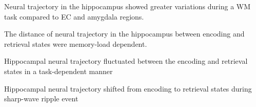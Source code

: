 \begin{highlights}
\item Neural trajectory in the hippocampus showed greater variations during a WM task compared to EC and amygdala regions.
\item The distance of neural trajectory in the hippocampus between encoding and retrieval states were memory-load dependent.
\item Hippocampal neural trajectory fluctuated between the encoding and retrieval states in a task-dependent manner
\item Hippocampal neural trajectory shifted from encoding to retrieval states during sharp-wave ripple event
\end{highlights}